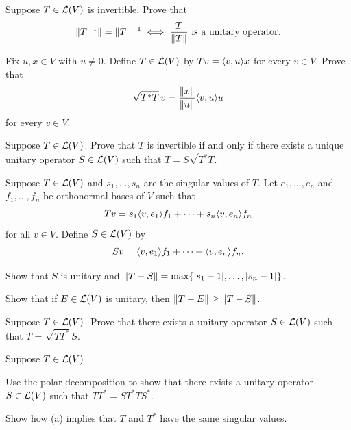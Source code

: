 \begin{exc}
\begin{exercise}
Suppose $T\in\mathcal{L}(V)$ is invertible. Prove that
\[ \lVert T^{-1} \rVert=\lVert T \rVert^{-1} \iff \frac{T}{\lVert T \rVert}
   \text{ is a unitary operator.} \]
\end{exercise}

\begin{exercise}
Fix $u,x\in V$ with $u\ne0$. Define $T\in\mathcal{L}(V)$ by $Tv=\langle v, u \rangle x$ for every
$v\in V$. Prove that
\[ \sqrt{T^*T}\,v = \frac{\lVert x \rVert}{\lVert u \rVert}\langle v, u \rangle u \]
for every $v\in V$.
\end{exercise}

\begin{exercise}
Suppose $T\in\mathcal{L}(V)$. Prove that $T$ is invertible if and only if there
exists a unique unitary operator $S\in\mathcal{L}(V)$ such that $T=S\sqrt{T^*T}$.
\end{exercise}

\begin{exercise}
Suppose $T\in\mathcal{L}(V)$ and $s_1,\dots,s_n$ are the singular values of $T$. Let
$e_1,\dots,e_n$ and $f_1,\dots,f_n$ be orthonormal bases of $V$ such that
\[ Tv = s_1\langle v, e_1 \rangle f_1+\cdots+s_n\langle v, e_n \rangle f_n \]
for all $v\in V$. Define $S\in\mathcal{L}(V)$ by
\[ Sv = \langle v, e_1 \rangle f_1+\cdots+\langle v, e_n \rangle f_n. \]
\begin{parts}
\item Show that $S$ is unitary and
  $\lVert T-S \rVert=\max\{\lvert s_1-1 \rvert,\dots,\lvert s_n-1 \rvert\}$.
\item Show that if $E\in\mathcal{L}(V)$ is unitary, then $\lVert T-E \rVert\ge\lVert T-S \rVert$.
\end{parts}
\end{exercise}

\begin{exercise}
Suppose $T\in\mathcal{L}(V)$. Prove that there exists a unitary operator
$S\in\mathcal{L}(V)$ such that $T=\sqrt{TT^*}\,S$.
\end{exercise}

\begin{exercise}
Suppose $T\in\mathcal{L}(V)$.
\begin{parts}
\item Use the polar decomposition to show that there exists a unitary operator
  $S\in\mathcal{L}(V)$ such that $TT^*=ST^*TS^*$.
\item Show how (a) implies that $T$ and $T^*$ have the same singular values.
\end{parts}
\end{exercise}


\end{exc}
